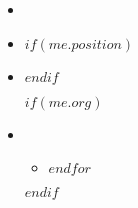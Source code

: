 \begin{itemize}[itemsep=\hdritemsep]

  \item {}

  \item {} \quad {}

  $if(me.position)$\item {}$endif$

  $if(me.org)$\item\vspace{-3pt}
  \begin{itemize}[itemsep=0pt]
    $for(me.org)$

    \item {}
    $endfor$

  \end{itemize}
  $endif$
\end{itemize}
